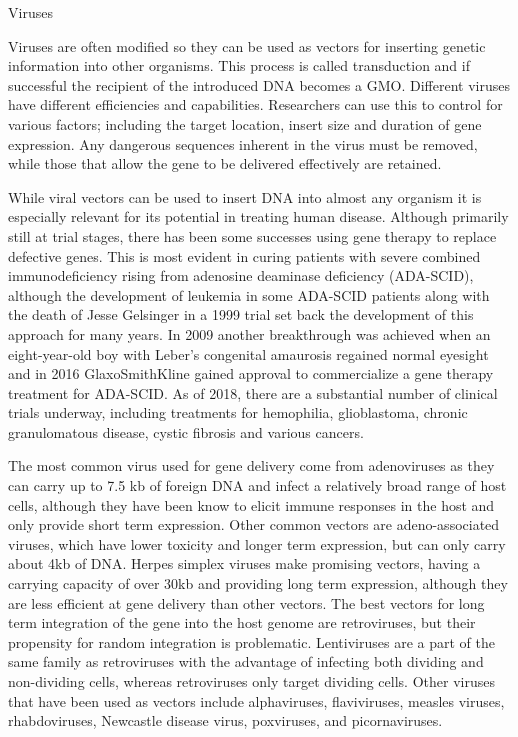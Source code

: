 Viruses

Viruses are often modified so they can be used as vectors for inserting genetic information into other organisms. This process is called transduction and if successful the recipient of the introduced DNA becomes a GMO. Different viruses have different efficiencies and capabilities. Researchers can use this to control for various factors; including the target location, insert size and duration of gene expression. Any dangerous sequences inherent in the virus must be removed, while those that allow the gene to be delivered effectively are retained.

While viral vectors can be used to insert DNA into almost any organism it is especially relevant for its potential in treating human disease. Although primarily still at trial stages, there has been some successes using gene therapy to replace defective genes. This is most evident in curing patients with severe combined immunodeficiency rising from adenosine deaminase deficiency (ADA-SCID), although the development of leukemia in some ADA-SCID patients along with the death of Jesse Gelsinger in a 1999 trial set back the development of this approach for many years. In 2009 another breakthrough was achieved when an eight-year-old boy with Leber's congenital amaurosis regained normal eyesight and in 2016 GlaxoSmithKline gained approval to commercialize a gene therapy treatment for ADA-SCID. As of 2018, there are a substantial number of clinical trials underway, including treatments for hemophilia, glioblastoma, chronic granulomatous disease, cystic fibrosis and various cancers.

The most common virus used for gene delivery come from adenoviruses as they can carry up to 7.5 kb of foreign DNA and infect a relatively broad range of host cells, although they have been know to elicit immune responses in the host and only provide short term expression. Other common vectors are adeno-associated viruses, which have lower toxicity and longer term expression, but can only carry about 4kb of DNA. Herpes simplex viruses make promising vectors, having a carrying capacity of over 30kb and providing long term expression, although they are less efficient at gene delivery than other vectors. The best vectors for long term integration of the gene into the host genome are retroviruses, but their propensity for random integration is problematic. Lentiviruses are a part of the same family as retroviruses with the advantage of infecting both dividing and non-dividing cells, whereas retroviruses only target dividing cells. Other viruses that have been used as vectors include alphaviruses, flaviviruses, measles viruses, rhabdoviruses, Newcastle disease virus, poxviruses, and picornaviruses.

